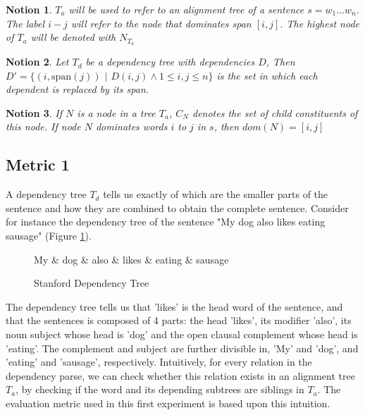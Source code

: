 \documentclass{report}
\theoremstyle{indented}
\newtheorem{notion}{Notion}
\begin{document}
\begin{notion}
$T_a$ will be used to refer to an alignment tree of a sentence $s = w_1 \dots w_n$. The label $i-j$ will refer to the node that dominates span $[i,j]$. The highest node of $T_a$ will be denoted with $N_{T_a}$
\end{notion}

\begin{notion}
Let $T_d$ be a dependency tree with dependencies $D$, Then $D' = \{ (i,\textrm{span}(j))$ $|$ $D(i,j) \land 1 \leq i,j \leq n \}$ is the set in which each dependent is replaced by its span.
\end{notion}

\begin{notion}
If $N$ is a node in a tree $T_a$, $C_N$ denotes the set of child constituents of this node. If node $N$ dominates words $i$ to $j$ in $s$, then $dom(N)= [i,j]$
\end{notion}

\subsection{Metric 1}

A dependency tree $T_d$ tells us exactly of which are the smaller parts of the sentence and how they are combined to obtain the complete sentence. Consider for instance the dependency tree of the sentence "My dog also likes eating sausage" (Figure \ref{fig:deptree1}).

\begin{figure}[!h]\label{fig:deptree1}
\centering
\begin{dependency}[theme=simple]%
\begin{deptext}[column sep=.5cm, row sep=.1ex]
My \& dog \& also \& likes \& eating \& sausage \\
\end{deptext}
\end{dependency}
\caption{Stanford Dependency Tree}
\end{figure}

\noindent The dependency tree tells us that 'likes' is the head word of the sentence, and that the sentences is composed of 4 parts: the head 'likes', its modifier 'also', its noun subject whose head is 'dog' and the open clausal complement whose head is 'eating'. The complement and subject are further divisible in, 'My' and 'dog', and 'eating' and 'sausage', respectively. Intuitively, for every relation in the dependency parse, we can check whether this relation exists in an alignment tree $T_a$, by checking if the word and its depending subtrees are siblings in $T_a$. The evaluation metric used in this first experiment is based upon this intuition.
\end{document}
